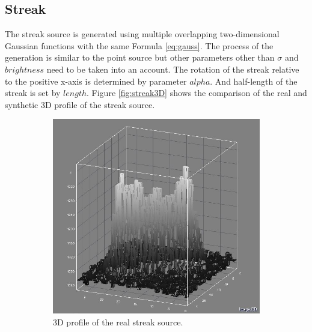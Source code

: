 \subsection{Streak}
The streak source is generated using multiple overlapping two-dimensional Gaussian functions with the same Formula \ref{eq:gauss}. The process of the generation is similar to the point source but other parameters other than $\sigma$ and $brightness$ need to be taken into an account. The rotation of the streak relative to the positive x-axis is determined by parameter $alpha$. And half-length of the streak is set by $length$. Figure \ref{fig:streak3D} shows the comparison of the real and synthetic 3D profile of the streak source. 


\begin{figure}[!h]
\centering
    \begin{subfigure}[t]{.4\textwidth}
        \centering
        \includegraphics[width=\textwidth]{images/realStreak3D.JPG}
        \caption{3D profile of the real streak source.}
        \label{fig:streak3D1}
    \end{subfigure}
    \begin{subfigure}[t]{.4\textwidth}
        \centering

\end{subfigure}
\end{figure}
